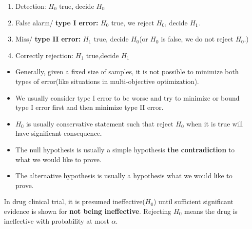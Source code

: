 \begin{refsection}
\begin{definition}\hfill
	\begin{enumerate}
		\item Detection: $H_0$ true, decide $H_0$
		\item False alarm/ \textbf{type I error:} $H_0$ true, we reject $H_0$, decide $H_1$. 
		\item Miss/ \textbf{type II error:} $H_1$ true, decide $H_0$(or $H_0$ is false, we do not reject $H_0$.)
		\item Correctly rejection: $H_1$ true,decide $H_1$
	\end{enumerate}
\end{definition}

\begin{remark}\cite[245]{hoggintroduction}\hfill
	\begin{itemize}
		\item Generally, given a fixed size of samples, it is not possible to minimize both types of error(like situations in multi-objective optimization).
		\item We usually consider type I error to be worse and try to minimize or bound type I error first and then minimize type II error.
		\item $H_0$ is usually conservative statement such that reject $H_0$ when it is true will have significant consequence. 	
	\end{itemize}
\end{remark}

\begin{remark}\hfill
	\begin{itemize}
		\item The null hypothesis is usually
		a simple hypothesis \textbf{the contradiction} to what we would like to prove.
		\item The alternative hypothesis is usually 
		a hypothesis what we would like to prove.
	\end{itemize}
\end{remark}

\begin{example}
	In drug clinical trial, it is presumed ineffective($H_0$) until sufficient significant evidence is shown for \textbf{not being ineffective}. Rejecting $H_0$ means the drug is ineffective with probability at most $\alpha$. 
\end{example}



\end{refsection}
